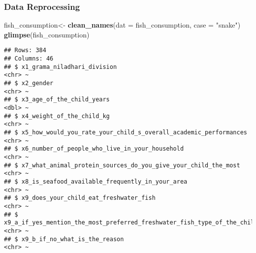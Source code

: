 \documentclass[
]{article}
\newenvironment{Shaded}{\begin{snugshade}}{\end{snugshade}}
\newcommand{\AttributeTok}[1]{\textcolor[rgb]{0.13,0.29,0.53}{#1}}
\newcommand{\FunctionTok}[1]{\textcolor[rgb]{0.13,0.29,0.53}{\textbf{#1}}}
\newcommand{\NormalTok}[1]{#1}
\newcommand{\OtherTok}[1]{\textcolor[rgb]{0.56,0.35,0.01}{#1}}
\newcommand{\StringTok}[1]{\textcolor[rgb]{0.31,0.60,0.02}{#1}}
\begin{document}
\hypertarget{data-reprocessing}{%
\subsubsection{Data Reprocessing}\label{data-reprocessing}}

\begin{Shaded}
\begin{Highlighting}[]
\NormalTok{fish\_consumption}\OtherTok{\textless{}{-}} \FunctionTok{clean\_names}\NormalTok{(}\AttributeTok{dat =}\NormalTok{ fish\_consumption, }\AttributeTok{case =} \StringTok{"snake"}\NormalTok{) }
\FunctionTok{glimpse}\NormalTok{(fish\_consumption)}
\end{Highlighting}
\end{Shaded}

\begin{verbatim}
## Rows: 384
## Columns: 46
## $ x1_grama_niladhari_division                                                                                                                  <chr> ~
## $ x2_gender                                                                                                                                    <chr> ~
## $ x3_age_of_the_child_years                                                                                                                    <dbl> ~
## $ x4_weight_of_the_child_kg                                                                                                                    <chr> ~
## $ x5_how_would_you_rate_your_child_s_overall_academic_performances                                                                             <chr> ~
## $ x6_number_of_people_who_live_in_your_household                                                                                               <chr> ~
## $ x7_what_animal_protein_sources_do_you_give_your_child_the_most                                                                               <chr> ~
## $ x8_is_seafood_available_frequently_in_your_area                                                                                              <chr> ~
## $ x9_does_your_child_eat_freshwater_fish                                                                                                       <chr> ~
## $ x9_a_if_yes_mention_the_most_preferred_freshwater_fish_type_of_the_child                                                                     <chr> ~
## $ x9_b_if_no_what_is_the_reason                                                                                                                <chr> ~

\end{verbatim}
\end{document}
